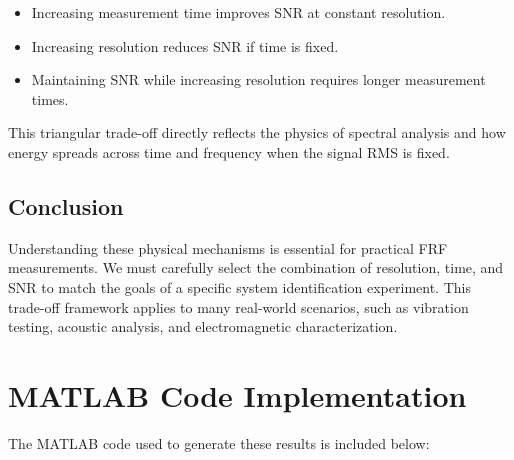 \documentclass[a4paper,12pt]{article}
\begin{document}
\begin{itemize}
    \item Increasing measurement time improves SNR at constant resolution.
    \item Increasing resolution reduces SNR if time is fixed.
    \item Maintaining SNR while increasing resolution requires longer measurement times.
\end{itemize}
This triangular trade-off directly reflects the physics of spectral analysis and how energy spreads across time and frequency when the signal RMS is fixed.

\subsection*{Conclusion}
Understanding these physical mechanisms is essential for practical FRF measurements. We must carefully select the combination of resolution, time, and SNR to match the goals of a specific system identification experiment. This trade-off framework applies to many real-world scenarios, such as vibration testing, acoustic analysis, and electromagnetic characterization.
\section*{MATLAB Code Implementation}
The MATLAB code used to generate these results is included below:
\end{document}
